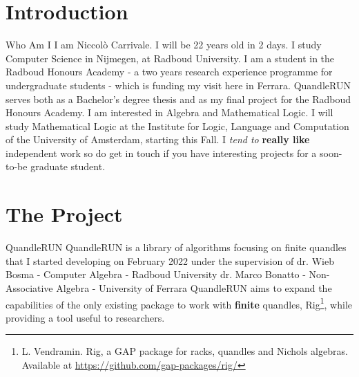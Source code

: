 \section{Introduction}
 \frame{\sectionpage}


\begin{frame}{Who Am I}
I am Niccolò Carrivale.\newline
I will be 22 years old in 2 days.\newline
I study Computer Science in Nijmegen, at Radboud University.\newline
I am a student in the Radboud Honours Academy - a two years research experience programme for undergraduate students - which is funding my visit here in Ferrara.\newline
QuandleRUN serves both as a Bachelor's degree thesis and as my final project for the Radboud Honours Academy.\newline\newline
I am interested in Algebra and Mathematical Logic. \newline
I will study Mathematical Logic at the Institute for Logic, Language and Computation of the University of Amsterdam, starting this Fall.\newline\newline
I \emph{tend to} \textbf{really like} independent work so do get in touch if you have interesting projects for a soon-to-be graduate student. 
\end{frame}   

\section{The Project}
\begin{frame}{QuandleRUN}
QuandleRUN is a library of algorithms focusing on finite quandles that I started developing on February 2022 under the supervision of\newline\newline
dr. Wieb Bosma - Computer Algebra - Radboud University \newline
dr. Marco Bonatto - Non-Associative Algebra - University of Ferrara\newline\newline
QuandleRUN aims to expand the capabilities of the only existing package to work with \textbf{finite} quandles, Rig\footnote{L. Vendramin. Rig, a GAP package for racks, quandles and Nichols algebras. Available at \href{https://github.com/gap-packages/rig/}{https://github.com/gap-packages/rig/} \newline}, while providing a tool useful to researchers. 
\end{frame} 

